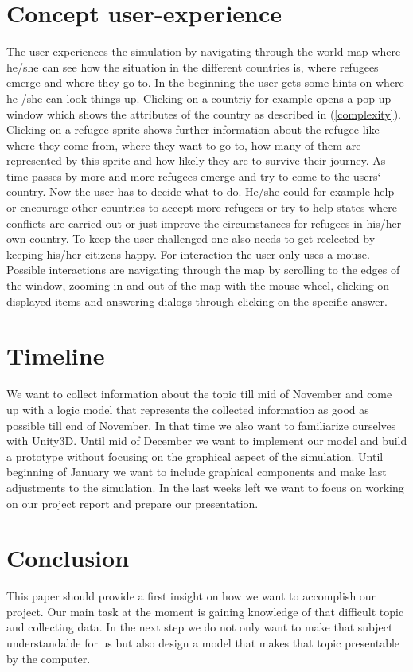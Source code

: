 \documentclass{acm_proc_article-sp}
\begin{document}
\section{Concept user-experience}
The user experiences the simulation by navigating through the world map where he/she can see how the situation in the different countries is, where refugees emerge and where they go to. In the beginning the user gets some hints on where he /she can look things up. Clicking on a countriy for example opens a pop up window which shows the attributes of the country as described in (\ref{complexity}). Clicking on a refugee sprite shows further information about the refugee like where they come from, where they want to go to, how many of them are represented by this sprite and how likely they are to survive their journey. As time passes by more and more refugees emerge and try to come to the users` country. Now the user has to decide what to do. He/she could for example help or encourage other countries to accept more refugees or try to help states where conflicts are carried out or just improve the circumstances for refugees in his/her own country.
To keep the user challenged one also needs to get reelected by keeping his/her citizens happy. For interaction the user only uses a mouse. Possible interactions are navigating through the map by scrolling to the edges of the window, zooming in and out of the map with the mouse wheel, clicking on displayed items and answering dialogs through clicking on the specific answer.

\section{Timeline}
We want to collect information about the topic till mid of November and come up with a logic model that represents the collected information as good as possible till end of November. In that time we also want to familiarize ourselves with Unity3D. Until mid of  December we want to implement our model and build a prototype without focusing on the graphical aspect of the simulation.  Until beginning of January we want to include graphical components and make last adjustments to the simulation. In the last weeks left we want to focus on working on our project report and prepare our presentation.

\section{Conclusion}
This paper should provide a first insight on how we want to accomplish our project. Our main task at the moment is gaining knowledge of that difficult topic and collecting data. In the next step we do not only want to make that subject understandable for us but also design a model that makes that topic presentable by the computer. 


 
\end{document}
